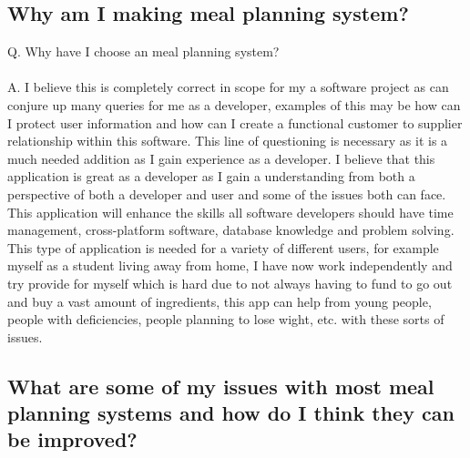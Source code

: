 \subsection{Why am I making meal planning system?}

Q. Why have I choose an meal planning system? \\ \\
A. I believe this is completely correct in scope for my a software project as can conjure up many queries for me as a developer, examples of this may be how can I protect user information and how can I create a functional customer to supplier relationship within this software. This line of questioning is necessary as it is a much needed addition as I gain experience as a developer. I believe that this application is great as a developer as I gain a understanding from both a perspective of both a developer and user and some of the issues both can face. This application will enhance the skills all software developers should have time management, cross-platform software, database knowledge and problem solving. This type of application is needed for a variety of different users, for example myself as a student living away from home, I have now work independently and try provide for myself which is hard due to not always having to fund to go out and buy a vast amount of ingredients, this app can help from young people, people with deficiencies, people planning to lose wight, etc. with these sorts of issues.

\subsection{What are some of my issues with most meal planning systems and how do I think they can be improved?}

